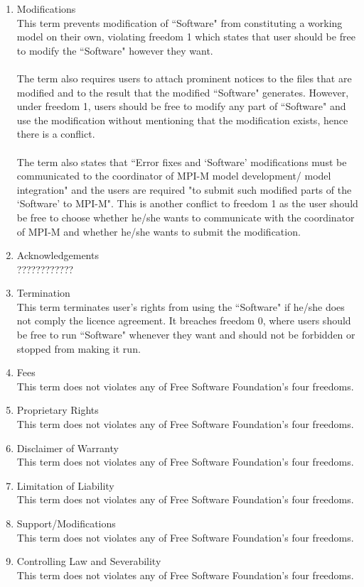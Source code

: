 \documentclass[a4paper]{article}
\begin{document}
\begin{enumerate}
\item Modifications
\\This term prevents modification of ``Software" from constituting a working model on their own, violating freedom 1 which states that user should be free to modify the ``Software" however they want.
\\
\\The term also requires users to attach prominent notices to the files that are modified and to the result that the modified ``Software" generates. However, under freedom 1, users should be free to modify any part of ``Software" and use the modification without mentioning that the modification exists, hence there is a conflict. 
\\
\\The term also states that ``Error fixes and `Software' modifications must be communicated to the coordinator of MPI-M model development/ model integration" and the users are required "to submit such modified parts of the `Software' to MPI-M". This is another conflict to freedom 1 as the user should be free to choose whether he/she wants to communicate with the coordinator of MPI-M and whether he/she wants to submit the modification. 

\item Acknowledgements
\\????????????
\item Termination
\\This term terminates user's rights from using the ``Software" if he/she does not comply the licence agreement. It breaches freedom 0, where users should be free to run ``Software" whenever they want and should not be forbidden or stopped from making it run.
\item Fees
\\ This term does not violates any of Free Software Foundation's four freedoms.
\item Proprietary Rights
\\ This term does not violates any of Free Software Foundation's four freedoms.
\item Disclaimer of Warranty
\\ This term does not violates any of Free Software Foundation's four freedoms.
\item Limitation of Liability
\\ This term does not violates any of Free Software Foundation's four freedoms.
\item Support/Modifications
\\ This term does not violates any of Free Software Foundation's four freedoms.
\item Controlling Law and Severability
\\ This term does not violates any of Free Software Foundation's four freedoms.
\end{enumerate}
\end{document}
